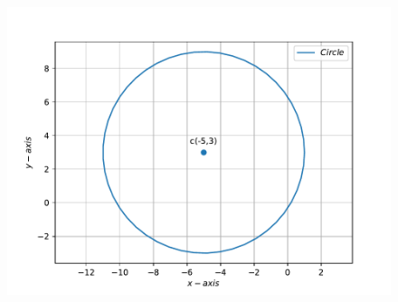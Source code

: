 \documentclass[12pt]{article}
\begin{document}
\begin{figure}[!h]
	\begin{center} 
	   \includegraphics[width=\columnwidth]{figs/fig.pdf}
	\end{center}
\caption{}
\label{fig:Fig1}
\end{figure}
\end{document}
